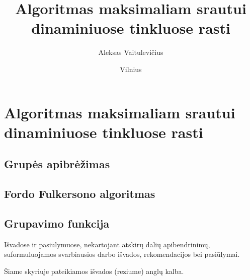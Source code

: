 \documentclass{VUMIFInfBakalaurinis}
\title{Algoritmas maksimaliam srautui dinaminiuose tinkluose rasti}
\author{Aleksas Vaitulevičius}
\date{Vilnius \\ \the\year}
\begin{document}
\maketitle







\tableofcontents





\section{Algoritmas maksimaliam srautui dinaminiuose tinkluose rasti}
\subsection{Grupės apibrėžimas}


\subsection{Fordo Fulkersono algoritmas}


\subsection{Grupavimo funkcija}


Išvadose ir pasiūlymuose, nekartojant atskirų dalių apibendrinimų,
suformuluojamos svarbiausios darbo išvados, rekomendacijos bei pasiūlymai.

Šiame skyriuje pateikiamos išvados (reziume) anglų kalba.


\printbibliography[heading=bibintoc] %

\appendix  %
\end{document}
